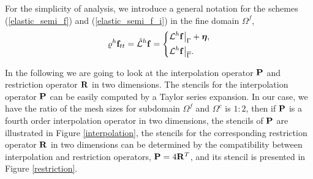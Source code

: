 For the simplicity of analysis, we introduce a general notation for the schemes (\ref{elastic_semi_f}) and (\ref{elastic_semi_f_i}) in the fine domain $\Omega^f$,
\begin{align}\label{fine_scheme}
{\varrho}^h{\bf f}_{tt} = \hat{\mathcal{L}}^h{\bf f} = \left\{
\begin{aligned}
&\mathcal{L}^h{\bf f}\big|_\Gamma +{\bm \eta}, \\
&\mathcal{L}^h{\bf f}\big|_{\overline{\Gamma}}.
\end{aligned}
\right.
\end{align}

In the following we are going to look at the interpolation operator ${\bf P}$ and restriction operator ${\bf R}$ in two dimensions. The stencils for the interpolation operator ${\bf P}$ can be easily computed by a Taylor series expansion. In our case, we have the ratio of the mesh sizes for subdomain $\Omega^f$ and $\Omega^c$ is $1:2$, then if  ${\bf P}$ is a fourth order interpolation operator in two dimensions,  the stencils of ${\bf P}$ are illustrated in  Figure \ref{interpolation}, the stencils for the corresponding restriction operator $\bf R$ in two dimensions can be determined by the compatibility between interpolation and restriction operators, ${\bf P} = 4{\bf R}^T$, and its stencil is presented in Figure \ref{restriction}.
